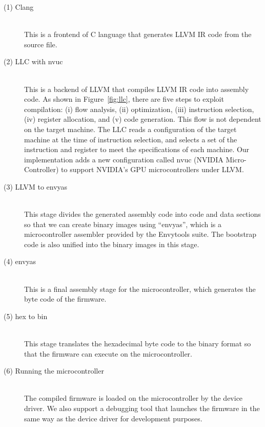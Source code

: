 \begin{description}
\item[ (1) Clang]\mbox{}\\
	   This is a frontend of C language that generates LLVM IR code
	   from the source file.

\item[ (2) LLC with nvuc]\mbox{}\\
	   This is a backend of LLVM that compiles LLVM IR code into
	   assembly code. 
	   As shown in Figure~\ref{fig:llc}, there are five steps to
	   exploit compilation: (i) flow analysis, (ii) optimization,
	   (iii) instruction selection, (iv) register allocation, and
	   (v) code generation.
	   This flow is not dependent on the target machine.
	   The LLC reads a configuration of the target machine at the
	   time of instruction selection, and selects a set of the
	   instruction and register to meet the specifications of each
	   machine.
	   Our implementation adds a new configuration called nvuc
	   (NVIDIA Micro-Controller) to support NVIDIA's GPU
	   microcontrollers under LLVM.

\item[ (3) LLVM to envyas]\mbox{}\\
	   This stage divides the generated assembly code into code and
	   data sections so that we can create binary images using
	   ``envyas'', which is a microcontroller assembler provided by
	   the Envytools suite.
	   The bootstrap code is also unified into the binary images
	   in this stage.

\item[ (4) envyas]\mbox{}\\
	   This is a final assembly stage for the microcontroller, which
	   generates the byte code of the firmware.

\item[ (5) hex to bin]\mbox{}\\
	   This stage translates the hexadecimal byte code to the binary
	   format so that the firmware can execute on the
	   microcontroller.

\item[ (6) Running the microcontroller]\mbox{}\\
	   The compiled firmware is loaded on the microcontroller by the
	   device driver.
	   We also support a debugging tool that launches the firmware
	   in the same way as the device driver for development
	   purposes.
\end{description}

